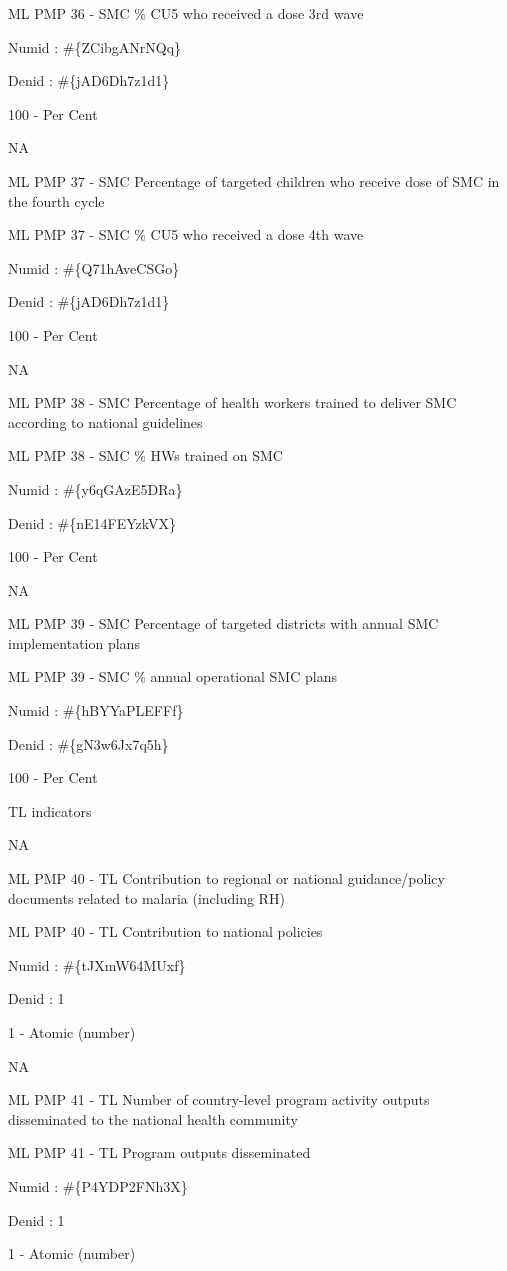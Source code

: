 \documentclass[]{book}
\begin{document}
ML PMP 36 - SMC \% CU5 who received a dose 3rd wave

Numid : \#\{ZCibgANrNQq\}

Denid : \#\{jAD6Dh7z1d1\}

100 - Per Cent

NA

ML PMP 37 - SMC Percentage of targeted children who receive dose of SMC in the fourth cycle

ML PMP 37 - SMC \% CU5 who received a dose 4th wave

Numid : \#\{Q71hAveCSGo\}

Denid : \#\{jAD6Dh7z1d1\}

100 - Per Cent

NA

ML PMP 38 - SMC Percentage of health workers trained to deliver SMC according to national guidelines

ML PMP 38 - SMC \% HWs trained on SMC

Numid : \#\{y6qGAzE5DRa\}

Denid : \#\{nE14FEYzkVX\}

100 - Per Cent

NA

ML PMP 39 - SMC Percentage of targeted districts with annual SMC implementation plans

ML PMP 39 - SMC \% annual operational SMC plans

Numid : \#\{hBYYaPLEFFf\}

Denid : \#\{gN3w6Jx7q5h\}

100 - Per Cent

TL indicators

NA

ML PMP 40 - TL Contribution to regional or national guidance/policy documents related to malaria (including RH)

ML PMP 40 - TL Contribution to national policies

Numid : \#\{tJXmW64MUxf\}

Denid : 1

1 - Atomic (number)

NA

ML PMP 41 - TL Number of country-level program activity outputs disseminated to the national health community

ML PMP 41 - TL Program outputs disseminated

Numid : \#\{P4YDP2FNh3X\}

Denid : 1

1 - Atomic (number)
\end{document}
